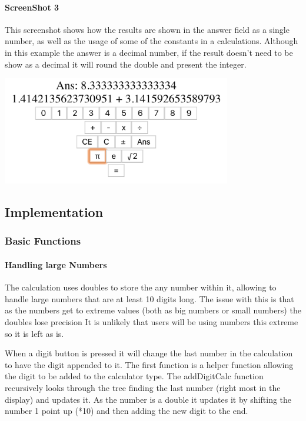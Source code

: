 \documentclass[a4paper]{article}
\begin{document}
\paragraph{ScreenShot 3}
This screenshot shows how the results are shown in the answer field as a single number, as well as the usage of some of the constants in a calculations.
Although in this example the answer is a decimal number, if the result doesn't need to be show as a decimal it will round the double and present the integer.
\begin{center}
    \includegraphics[width=10cm]{Suppliments/calculator3.png}
\end{center}

\subsection{Implementation}
\subsubsection{Basic Functions}
\paragraph{Handling large Numbers}
The calculation uses doubles to store the any number within it, allowing to handle large numbers that are at least 10 digits long.
The issue with this is that as the numbers get to extreme values (both as big numbers or small numbers) the doubles lose precision
It is unlikely that users will be using numbers this extreme so it is left as is.
\par
When a digit button is pressed it will change the last number in the calculation to have the digit appended to it.
The first function is a helper function allowing the digit to be added to the calculator type.
The addDigitCalc function recursively looks through the tree finding the last number (right most in the display) and updates it.
As the number is a double it updates it by shifting the number 1 point up (*10) and then adding the new digit to the end.

\end{document}
